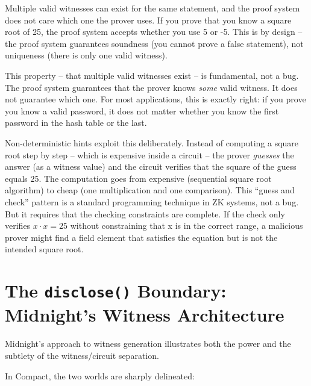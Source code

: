 \documentclass[
  11pt,
  openany]{report}
\begin{document}
Multiple valid witnesses can exist for the same statement, and the proof system
does not care which one the prover uses. If you prove that you know a square
root of 25, the proof system accepts whether you use 5 or -5. This is by design
-- the proof system guarantees soundness (you cannot prove a false statement),
not uniqueness (there is only one valid witness).

This property -- that multiple valid witnesses exist -- is fundamental, not a
bug. The proof system guarantees that the prover knows \emph{some} valid
witness. It does not guarantee which one. For most applications, this is exactly
right: if you prove you know a valid password, it does not matter whether you
know the first password in the hash table or the last.

Non-deterministic hints exploit this deliberately. Instead of computing a square
root step by step -- which is expensive inside a circuit -- the prover
\emph{guesses} the answer (as a witness value) and the circuit verifies that the
square of the guess equals 25. The computation goes from expensive (sequential
square root algorithm) to cheap (one multiplication and one comparison). This
``guess and check'' pattern is a standard programming technique in ZK systems,
not a bug. But it requires that the checking constraints are complete. If the
check only verifies \(x \cdot x = 25\) without constraining that x is in the
correct range, a malicious prover might find a field element that satisfies the
equation but is not the intended square root.

\section{\texorpdfstring{The \texttt{disclose()} Boundary: Midnight's Witness
Architecture}{The disclose() Boundary: Midnight's Witness Architecture}}\label{the-disclose-boundary-midnights-witness-architecture}

Midnight's approach to witness generation illustrates both the power and the
subtlety of the witness/circuit separation.

In Compact, the two worlds are sharply delineated:
\end{document}
